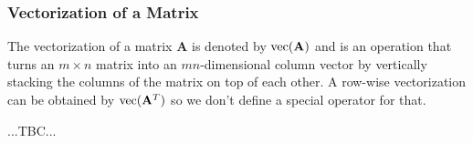 %

\subsubsection{Vectorization of a Matrix}
The vectorization of a matrix $\mathbf{A}$ is denoted by $\operatorname{vec}(\mathbf{A})$ and is an operation that turns an $m \times n$ matrix into an $mn$-dimensional column vector by vertically stacking the columns of the matrix on top of each other. A row-wise vectorization can be obtained by $\operatorname{vec}(\mathbf{A}^T)$ so we don't define a special operator for that. 



...TBC...









